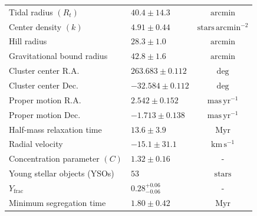 \documentclass{aa}
\begin{document}
\begin{table}
{\begin{tabular}{llc}
			Tidal radius $(R_t)$                    & $40.4 \pm 14.3$ & $\mathrm{arcmin}$                  \\
			Center density $(k)$                    & $4.91 \pm 0.44$   & $\mathrm{stars\,arcmin^{-2}}$      \\
			Hill radius                             & $28.3 \pm 1.0$            & $\mathrm{arcmin}$                  \\
			Gravitational bound radius              & $42.8 \pm 1.6$            & $\mathrm{arcmin}$                  \\
			Cluster center R.A.                     & $263.683 \pm 0.112$ & $\mathrm{deg}$                     \\
			Cluster center Dec.                     & $-32.584 \pm 0.112$ & $\mathrm{deg}$                     \\
				Proper motion R.A.                      & $2.542 \pm 0.152$  & $\mathrm{mas\,yr^{-1}}$            \\
				Proper motion Dec.                      & $-1.713 \pm 0.138$ & $\mathrm{mas\,yr^{-1}}$            \\
			Half-mass relaxation time               & $13.6 \pm 3.9$             & $\mathrm{Myr}$                     \\
			Radial velocity                         & $-15.1 \pm 31.1$  & $\mathrm{km\,s^{-1}}$              \\
			Concentration parameter $(C)$           & $1.32 \pm 0.16$    & -                                  \\
			Young stellar objects (YSOs)            & $53$                & $\mathrm{stars}$                   \\
			$Y_{\text{frac}}$                       & $0.28^{+0.06}_{-0.06}$              & -                                  \\
			Minimum segregation time                & $1.80 \pm 0.42$             & $\mathrm{Myr}$                     \\ \hline
		\end{tabular}%
	}
	\label{tab:ngc6383_results}
\end{table}
\end{document}
